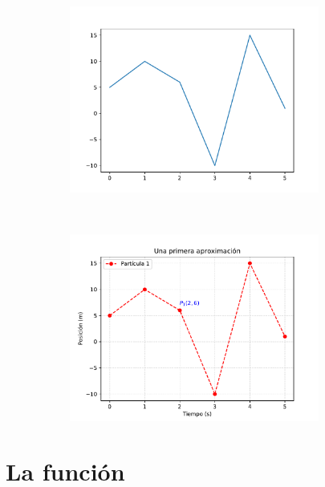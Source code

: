 \begin{figure}[h!]
\begin{subfigure}{0.48\textwidth}
\centering
\includegraphics[width=0.9\textwidth]{img/ch03/grafica_01a.pdf}
\label{fig:grafica_01a}
\end{subfigure}~
\begin{subfigure}{0.48\textwidth}
\centering
\includegraphics[width=0.9\textwidth]{img/ch03/grafica_01b.pdf}
\label{fig:grafica_01b}
\end{subfigure}

\caption{}
\end{figure}



\section{La función }

